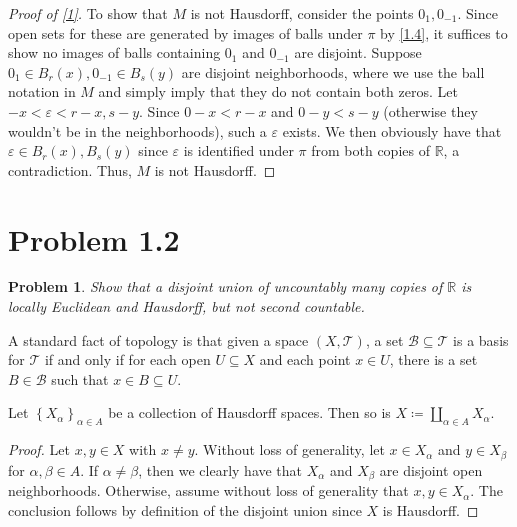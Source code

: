 \documentclass[11pt, letterpaper]{article}
\theoremstyle{theorem}
\newtheorem{problem}{Problem}
\begin{document}
\begin{proof}[Proof of \cref{1}]
	To show that $M$ is not Hausdorff, consider the points $0_1,0_{-1} $. Since open sets for these are generated by images of balls under $\pi $ by \cref{1.4}, it suffices to show no images of balls containing $0_1$ and $0_{-1} $ are disjoint. Suppose $0_1\in B_r(x),0_{-1} \in B_s(y)$ are disjoint neighborhoods, where we use the ball notation in $M$ and simply imply that they do not contain both zeros. Let $-x<\varepsilon <r-x,s-y$. Since $0-x<r-x$ and $0-y<s-y$ (otherwise they wouldn't be in the neighborhoods), such a $\varepsilon $ exists. We then obviously have that $\varepsilon \in B_r(x),B_s(y)$ since $\varepsilon $ is identified under $\pi $ from both copies of $\mathbb{R} $, a contradiction. Thus, $M$ is not Hausdorff.
\end{proof}

\section{Problem 1.2}


\begin{problem}\label{2}
	Show that a disjoint union of uncountably many copies of $\mathbb{R} $ is locally Euclidean and Hausdorff, but not second countable.
\end{problem}
\begin{remark}\label{2.1}
	A standard fact of topology is that given a space $(X,\mathcal{T} )$, a set $\mathcal{B} \subseteq \mathcal{T} $ is a basis for $\mathcal{T} $ if and only if for each open $U\subseteq X$ and each point $x\in U$, there is a set $B\in \mathcal{B} $ such that $x\in B\subseteq U$.
\end{remark}

\begin{lemma}\label{2.2}
	Let $\left\{ X_\alpha  \right\}_{\alpha \in A} $ be a collection of Hausdorff spaces. Then so is $X\coloneqq \coprod_{\alpha \in A} X_\alpha $.
\end{lemma}
\begin{proof}
	Let $x,y\in X$ with $x\neq y$. Without loss of generality, let $x\in X_\alpha $ and $y\in X_\beta $ for $\alpha ,\beta \in A$. If $\alpha \neq \beta $, then we clearly have that $X_\alpha $ and $X_\beta $ are disjoint open neighborhoods. Otherwise, assume without loss of generality that $x,y\in X_\alpha $. The conclusion follows by definition of the disjoint union since $X$ is Hausdorff.
\end{proof}
\end{document}

